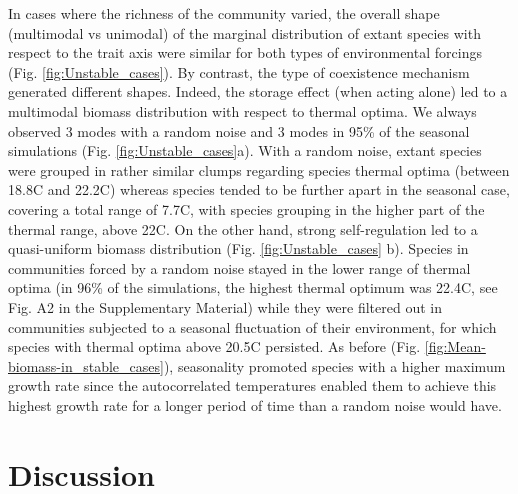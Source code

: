 \documentclass[smallcondensed,referee]{svjour3}       %
\begin{document}
In cases where the richness of the community varied, the overall shape
(multimodal vs unimodal) of the marginal distribution of extant species
with respect to the trait axis were similar for both types of environmental
forcings (Fig. \ref{fig:Unstable_cases}). By contrast, the type of
coexistence mechanism generated different shapes. Indeed, the storage
effect (when acting alone) led to a multimodal biomass distribution
with respect to thermal optima. We always observed 3 modes with a
random noise and 3 modes in 95\% of the seasonal simulations (Fig.
\ref{fig:Unstable_cases}a). With a random noise, extant species were
grouped in rather similar clumps regarding species thermal optima
(between 18.8\textdegree C and 22.2\textdegree C) whereas species tended to be further apart
in the seasonal case, covering a total range of 7.7\textdegree C, with species
grouping in the higher part of the thermal range, above 22\textdegree C. On the
other hand, strong self-regulation led to a quasi-uniform biomass
distribution (Fig. \ref{fig:Unstable_cases} b). Species in communities
forced by a random noise stayed in the lower range of thermal optima
(in 96\% of the simulations, the highest thermal optimum was 22.4\textdegree C,
see Fig. A2 in the Supplementary Material) while they were filtered
out in communities subjected to a seasonal fluctuation of their environment,
for which species with thermal optima above 20.5\textdegree C persisted. As before
(Fig. \ref{fig:Mean-biomass-in_stable_cases}), seasonality promoted
species with a higher maximum growth rate since the autocorrelated
temperatures enabled them to achieve this highest growth rate for
a longer period of time than a random noise would have. 

\section*{Discussion}
\end{document}
